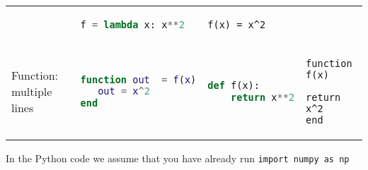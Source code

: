 \begin{tabular}[]{@{}llll@{}}
\begin{minipage}[t]{0.22\columnwidth}
\end{minipage} & \begin{minipage}[t]{0.22\columnwidth}\raggedright
\begin{lstlisting}[language=Python]
f = lambda x: x**2
\end{lstlisting}

\end{minipage} & \begin{minipage}[t]{0.25\columnwidth}\raggedright
\begin{lstlisting}
f(x) = x^2
\end{lstlisting}

\end{minipage}\tabularnewline
\begin{minipage}[t]{0.19\columnwidth}\raggedright
Function: multiple lines
\end{minipage} & \begin{minipage}[t]{0.22\columnwidth}\raggedright
\begin{lstlisting}[language=Matlab]
function out  = f(x)
   out = x^2
end
\end{lstlisting}

\end{minipage} & \begin{minipage}[t]{0.22\columnwidth}\raggedright
\begin{lstlisting}[language=Python]
def f(x):
    return x**2
\end{lstlisting}

\end{minipage} & \begin{minipage}[t]{0.25\columnwidth}\raggedright
\begin{lstlisting}
function f(x)
   return x^2
end
\end{lstlisting}

\end{minipage}\tabularnewline
\bottomrule
\end{tabular}

In the Python code we assume that you have already run
\lstinline!import numpy as np!
